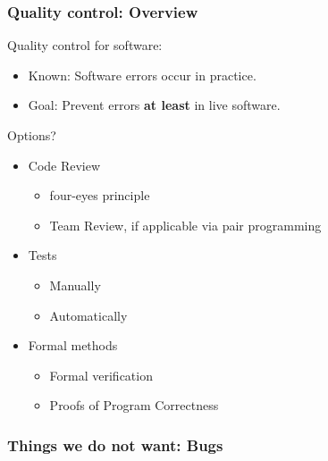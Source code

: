 
\begin{frame}
 \frametitle{Quality control: Overview}

Quality control for software:
\begin{itemize}
	\item Known: Software errors occur in practice.
  \item Goal: Prevent errors \textbf{at least} in live software.
\end{itemize}
Options?
 \pause
\begin{itemize}
	\item Code Review
   \begin{itemize}
    \item four-eyes principle
    \item Team Review, if applicable via pair programming
   \end{itemize} \pause
   \item Tests
   \begin{itemize}
    \item Manually
    \item Automatically
   \end{itemize} \pause
   \item Formal methods
   \begin{itemize}
    \item Formal verification
    \item Proofs of Program Correctness 
   \end{itemize}
\end{itemize}
\end{frame}


\begin{frame}
\frametitle{Things we do not want: Bugs}
\framesubtitle{\citep{Binder1999}}

\end{frame}




